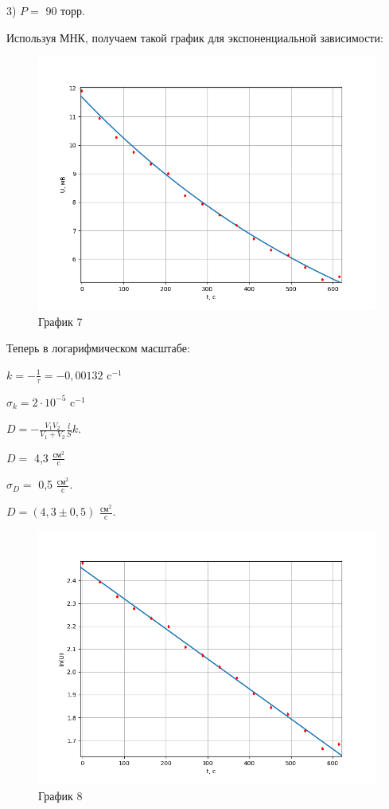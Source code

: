 \documentclass[a4paper,12pt]{article} %
\begin{document}
\begin{enumerate}
\newpage

3) $P = $ 90 торр.

Используя МНК, получаем такой график для экспоненциальной зависимости:
\begin{figure}[h!]
	\centering
	\includegraphics[scale=0.8]{Pictures/График3(эксп).png}
	\caption*{График 7}
\end{figure}

Теперь в логарифмическом масштабе:

$k = -\frac{1}{\tau} = -0,00132$ c$^{-1}$

$\sigma_{k} = 2\cdot 10^{-5}$ c$^{-1}$

$D = - \frac{V_{1}V_{2}}{V_{1} + V_{2}}\frac{l}{S}k$.

$D = $ 4,3 $\frac{\text{см}^2}{\text{c}}$

$\sigma_{D} = $ 0,5 $\frac{\text{см}^2}{\text{c}}$.
\vspace{15mm}

$D = (4,3 \pm 0,5)$ $\frac{\text{см}^2}{\text{c}}$.
\newpage
\begin{figure}[h!]
	\centering
	\includegraphics[scale=0.8]{Pictures/График3(лин).png}
	\caption*{График 8}
\end{figure}


\end{enumerate}
\end{document}
